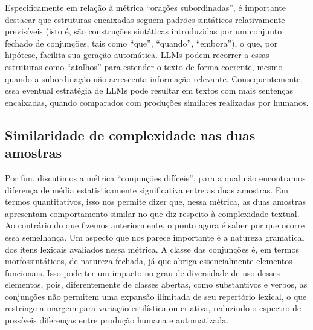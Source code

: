 \documentclass[portuguese]{textolivre}
\begin{document}
Especificamente em relação à métrica ``orações subordinadas'', é importante destacar que estruturas encaixadas seguem padrões sintáticos relativamente previsíveis (isto é, são construções sintáticas introduzidas por um conjunto fechado de conjunções, tais como ``que'', ``quando'', ``embora''), o que, por hipótese, facilita sua geração automática.
LLMs podem recorrer a essas estruturas como ``atalhos'' para estender o texto de forma coerente, mesmo quando a subordinação não acrescenta informação relevante.
Consequentemente, essa eventual estratégia de LLMs pode resultar em textos com mais sentenças encaixadas, quando comparados com produções similares realizadas por humanos.

\subsection{Similaridade de complexidade nas duas amostras}\label{sec-similaridade}
Por fim, discutimos  a métrica ``conjunções difíceis'', para a qual não encontramos diferença de média estatisticamente significativa entre as duas amostras.
Em termos quantitativos, isso nos permite dizer que, nessa métrica, as duas amostras apresentam comportamento similar no que diz respeito à complexidade textual.
Ao contrário do que fizemos anteriormente, o ponto agora é saber por que ocorre essa semelhança.
Um aspecto que nos parece importante é a natureza gramatical dos itens lexicais avaliados nessa métrica.
A classe das conjunções é, em termos morfossintáticos, de natureza fechada, já que abriga essencialmente elementos funcionais.
Isso pode ter um impacto no grau de diversidade de uso desses elementos, pois, diferentemente de classes abertas, como substantivos e verbos, as conjunções não permitem uma expansão ilimitada de seu repertório lexical, o que restringe a margem para variação estilística ou criativa, reduzindo o espectro de possíveis diferenças entre produção humana e automatizada.
\end{document}
